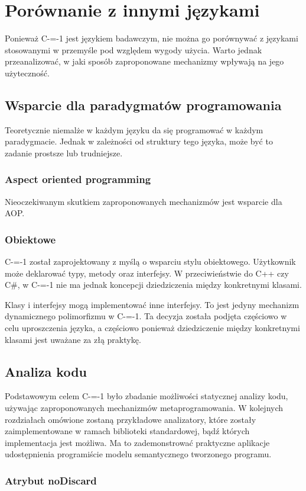 \section{Porównanie z innymi językami}
Ponieważ C-=-1 jest językiem badawczym, nie można go porównywać z językami stosowanymi w przemyśle pod względem wygody użycia. Warto jednak przeanalizować, w jaki sposób zaproponowane mechanizmy wpływają na jego użyteczność.
\subsection{Wsparcie dla paradygmatów programowania}
Teoretycznie niemalże w każdym języku da się programować w każdym paradygmacie. Jednak w zależności od struktury tego języka, może być to zadanie prostsze lub trudniejsze. 
\subsubsection{Aspect oriented programming}
Nieoczekiwanym skutkiem zaproponowanych mechanizmów jest wsparcie dla AOP.
\subsubsection{Obiektowe}
C-=-1 został zaprojektowany z myślą o wsparciu stylu obiektowego. Użytkownik może deklarować typy, metody oraz interfejsy. W przeciwieństwie do C++ czy C\#, w C-=-1 nie ma jednak koncepcji dziedziczenia między konkretnymi klasami.

Klasy i interfejsy mogą implementować inne interfejsy. To jest jedyny mechanizm dynamicznego polimorfizmu w C-=-1. Ta decyzja została podjęta częściowo w celu uproszczenia języka, a częściowo ponieważ dziedziczenie między konkretnymi klasami jest uważane za złą praktykę.

\subsection{Analiza kodu}
Podstawowym celem C-=-1 było zbadanie możliwości statycznej analizy kodu, używając zaproponowanych mechanizmów metaprogramowania.
W kolejnych rozdziałach omówione zostaną przykładowe analizatory, które zostały zaimplementowane w ramach biblioteki standardowej, bądź których implementacja jest możliwa.
Ma to zademonstrować praktyczne aplikacje udostępnienia programiście modelu semantycznego tworzonego programu.



\subsubsection{Atrybut noDiscard}
\label{no_discard}

